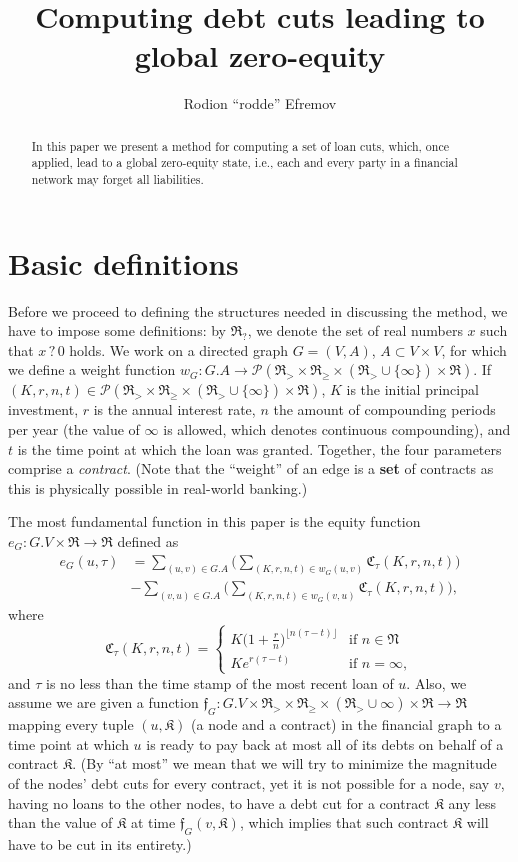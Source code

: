 \documentclass[10pt]{article}
\title{Computing debt cuts leading to global zero-equity}
\author{Rodion ``rodde'' Efremov}
\newcommand{\RR}{\mathfrak{R}}
\newcommand{\KK}{\mathfrak{K}}
\newcommand{\CC}{\mathfrak{C}}
\newcommand{\ff}{\mathfrak{f}}
\begin{document}
  \maketitle
  
  \begin{abstract}
  In this paper we present a method for computing a set of loan cuts, which, once applied, lead to a global zero-equity state, i.e., each and every party in a financial network may forget all liabilities. 
  \end{abstract}
  
  \section{Basic definitions}
  Before we proceed to defining the structures needed in discussing the method, we have to impose some definitions: by $\RR_?$, we denote the set of real numbers $x$ such that $x \, ? \, 0$ holds. We work on a directed graph $G=(V,A)$, $A \subset V \times V$, for which we define a weight function $w_G \colon G.A \to \mathcal{P}(\RR_> \times \RR_{\geq} \times (\RR_> \cup \{\infty\}) \times \RR)$. If $(K, r, n, t) \in \mathcal{P}(\RR_> \times \RR_{\geq} \times (\RR_> \cup \{\infty\}) \times \RR)$, $K$ is the initial principal investment, $r$ is the annual interest rate, $n$ the amount of compounding periods per year (the value of $\infty$ is allowed, which denotes continuous compounding), and $t$ is the time point at which the loan was granted. Together, the four parameters comprise a \textit{contract}. (Note that the ``weight'' of an edge is a \textbf{set} of contracts as this is physically possible in real-world banking.) 

The most fundamental function in this paper is the equity function $e_G \colon G.V \times \RR \to \RR$ defined as 
\begin{align*}
e_G(u, \tau) &= \sum_{(u, v) \in G.A} \Bigg( \sum_{(K, r, n, t) \in w_G(u, v)} \CC_{\tau}(K, r, n, t) \Bigg) \\
&- \sum_{(v, u) \in G.A} \Bigg( \sum_{(K, r, n, t) \in w_G(v,u)} \CC_{\tau}(K, r, n, t) \Bigg),
\end{align*}
where 
\[
\CC_{\tau}(K, r, n, t) = 
\begin{cases}
K\big( 1 + \frac{r}{n}\big)^{\lfloor n(\tau - t) \rfloor} & \mbox{if } n \in \mathfrak{N} \\
Ke^{r(\tau - t)} & \mbox{if } n = \infty,
\end{cases}
\]
and $\tau$ is no less than the time stamp of the most recent loan of $u$. Also, we assume we are given a function $\ff_G \colon G.V \times \RR_{>} \times \RR_{\geq} \times (\RR_{>} \cup \infty) \times \RR \to \RR$ mapping every tuple $(u, \KK)$ (a node and a contract) in the financial graph to a time point at which $u$ is ready to pay back at most all of its debts on behalf of a contract $\KK$. (By ``at most'' we mean that we will try to minimize the magnitude of the nodes' debt cuts for every contract, yet it is not possible for a node, say $v$, having no loans to the other nodes, to have a debt cut for a contract $\KK$ any less than the value of $\KK$ at time $\ff_G(v, \KK)$, which implies that such contract $\KK$ will have to be cut in its entirety.)
\end{document}
